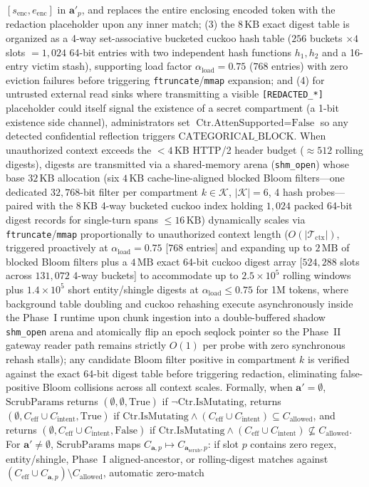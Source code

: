 \documentclass[conference,10pt]{IEEEtran}
\begin{document}
$[s_{\text{enc}}, e_{\text{enc}}]$ in $\mathbf{a}'_p$, and replaces the entire enclosing encoded token with the redaction placeholder upon any inner match; (3) the $8\,\text{KB}$ exact digest table is organized as a 4-way set-associative bucketed cuckoo hash table ($256$ buckets $\times 4$ slots $= 1{,}024$ 64-bit entries with two independent hash functions $h_1, h_2$ and a 16-entry victim stash), supporting load factor $\alpha_{\text{load}} = 0.75$ ($768$ entries) with zero eviction failures before triggering \texttt{ftruncate}/\texttt{mmap} expansion; and (4) for untrusted external read sinks where transmitting a visible \texttt{[REDACTED\_*]} placeholder could itself signal the existence of a secret compartment (a 1-bit existence side channel), administrators set $\text{Ctr.AttenSupported} = \text{False}$ so any detected confidential reflection triggers $\text{CATEGORICAL\_BLOCK}$. When unauthorized context exceeds the $< 4$\,KB HTTP/2 header budget ($\approx 512$ rolling digests), digests are transmitted via a shared-memory arena (\texttt{shm\_open}) whose base $32\,\text{KB}$ allocation (six $4\,\text{KB}$ cache-line-aligned blocked Bloom filters---one dedicated $32{,}768$-bit filter per compartment $k \in \mathcal{K}$, $|\mathcal{K}| = 6$, 4 hash probes---paired with the $8\,\text{KB}$ 4-way bucketed cuckoo index holding $1{,}024$ packed 64-bit digest records for single-turn spans $\le 16\,\text{KB}$) dynamically scales via \texttt{ftruncate}/\texttt{mmap} proportionally to unauthorized context length ($O(|\mathcal{T}_{\text{ctx}}|)$, triggered proactively at $\alpha_{\text{load}} = 0.75$ [$768$ entries] and expanding up to $2\,\text{MB}$ of blocked Bloom filters plus a $4\,\text{MB}$ exact 64-bit cuckoo digest array [$524{,}288$ slots across $131{,}072$ 4-way buckets] to accommodate up to $2.5 \times 10^5$ rolling windows plus $1.4 \times 10^5$ short entity/shingle digests at $\alpha_{\text{load}} \le 0.75$ for 1M tokens, where background table doubling and cuckoo rehashing execute asynchronously inside the Phase~I runtime upon chunk ingestion into a double-buffered shadow \texttt{shm\_open} arena and atomically flip an epoch seqlock pointer so the Phase~II gateway reader path remains strictly $O(1)$ per probe with zero synchronous rehash stalls); any candidate Bloom filter positive in compartment $k$ is verified against the exact 64-bit digest table before triggering redaction, eliminating false-positive Bloom collisions across all context scales. Formally, when $\mathbf{a}' = \emptyset$, $\text{ScrubParams}$ returns $(\emptyset, \emptyset, \text{True})$ if $\neg\text{Ctr.IsMutating}$, returns $(\emptyset, C_{\text{eff}} \cup C_{\text{intent}}, \text{True})$ if $\text{Ctr.IsMutating} \land (C_{\text{eff}} \cup C_{\text{intent}}) \subseteq C_{\text{allowed}}$, and returns $(\emptyset, C_{\text{eff}} \cup C_{\text{intent}}, \text{False})$ if $\text{Ctr.IsMutating} \land (C_{\text{eff}} \cup C_{\text{intent}}) \not\subseteq C_{\text{allowed}}$. For $\mathbf{a}' \ne \emptyset$, $\text{ScrubParams}$ maps $C_{\mathbf{a}, p} \mapsto C_{\mathbf{a}_{\text{scrub}}, p}$: if slot $p$ contains zero regex, entity/shingle, Phase~I aligned-ancestor, or rolling-digest matches against $(C_{\text{eff}} \cup C_{\mathbf{a}, p}) \setminus C_{\text{allowed}}$, automatic zero-match 
\end{document}
